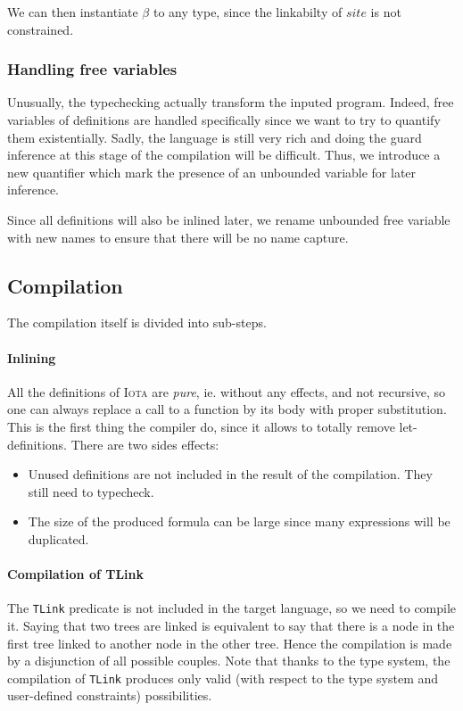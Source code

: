 \documentclass[10pt,a4paper]{article}
\newcommand\Iota{\textsc{Iota}}
\newcommand{\ocaml}{\texttt}
\begin{document}
We can then instantiate $\beta$ to any type, since the linkabilty of $site$ is not constrained.

\subsubsection{Handling free variables}
Unusually, the typechecking actually transform the inputed program. Indeed, free variables of definitions are handled specifically since we want to try to quantify them existentially. Sadly, the language is still very rich and doing the guard inference at this stage of the compilation will be difficult. Thus, we introduce a new quantifier which mark the presence of an unbounded variable for later inference.

Since all definitions will also be inlined later, we rename unbounded free variable with new names to ensure that there will be no name capture.

\subsection{Compilation}
The compilation itself is divided into sub-steps.

\paragraph{Inlining}
All the definitions of \Iota{} are \emph{pure}, ie. without any effects, and not recursive, so one can always replace a call to a function by its body with proper substitution. This is the first thing the compiler do, since it allows to totally remove let-definitions. There are two sides effects:

\begin{itemize}
\item Unused definitions are not included in the result of the compilation. They still need to typecheck.
\item The size of the produced formula can be large since many expressions will be duplicated.
\end{itemize}

\paragraph{Compilation of TLink}
\label{para:tlink}
The \ocaml{TLink} predicate is not included in the target language, so we need to compile it.
Saying that two trees are linked is equivalent to say that there is a node in the first tree linked to another node in the other tree. Hence the compilation is made by a disjunction of all possible couples.
Note that thanks to the type system, the compilation of \ocaml{TLink} produces only valid (with respect to the type system and user-defined constraints) possibilities.
\end{document}
